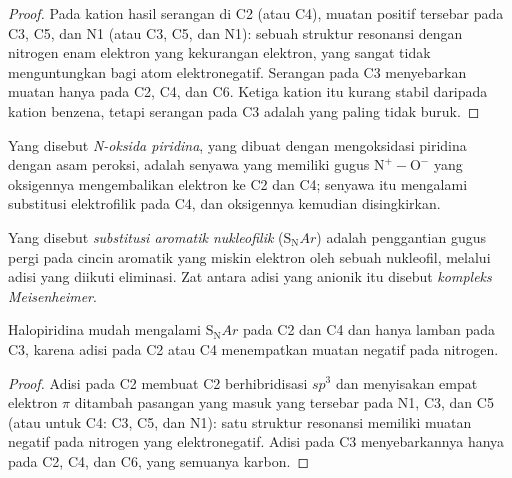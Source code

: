 \begin{proof}
Pada kation hasil serangan di C2 (atau C4), muatan positif tersebar pada C3, C5,
dan N1 (atau C3, C5, dan N1): sebuah struktur resonansi dengan nitrogen enam elektron yang
kekurangan elektron, yang sangat tidak menguntungkan bagi atom elektronegatif. Serangan
pada C3 menyebarkan muatan hanya pada C2, C4, dan C6. Ketiga kation itu kurang stabil
daripada kation benzena, tetapi serangan pada C3 adalah yang paling tidak buruk.
\end{proof}

\begin{definition}\label{def:b3:heterocycles:n-oxide}
Yang disebut \emph{N-oksida piridina}, yang dibuat dengan mengoksidasi piridina
dengan asam peroksi, adalah senyawa yang memiliki gugus $\mathrm{N^+{-}O^-}$ yang oksigennya mengembalikan elektron ke C2
dan C4; senyawa itu mengalami substitusi elektrofilik pada C4, dan oksigennya kemudian
disingkirkan.
\end{definition}

\begin{definition}\label{def:b3:heterocycles:snar}
Yang disebut \emph{substitusi aromatik nukleofilik}
($\mathrm S_\mathrm NAr$) adalah penggantian gugus pergi pada cincin aromatik yang miskin elektron
oleh sebuah nukleofil, melalui adisi yang diikuti eliminasi. Zat antara adisi yang
anionik itu disebut \emph{kompleks Meisenheimer}.
\end{definition}

\begin{proposition}\label{prop:b3:heterocycles:snar-positions}
Halopiridina mudah mengalami $\mathrm S_\mathrm NAr$ pada C2 dan C4 dan hanya lamban pada C3,
karena adisi pada C2 atau C4 menempatkan muatan negatif pada nitrogen.
\end{proposition}

\begin{proof}
Adisi pada C2 membuat C2 berhibridisasi $sp^3$ dan menyisakan empat elektron $\pi$ ditambah pasangan yang masuk
yang tersebar pada N1, C3, dan C5 (atau untuk C4: C3, C5, dan N1): satu struktur resonansi memiliki
muatan negatif pada nitrogen yang elektronegatif. Adisi pada C3 menyebarkannya hanya pada
C2, C4, dan C6, yang semuanya karbon.
\end{proof}


